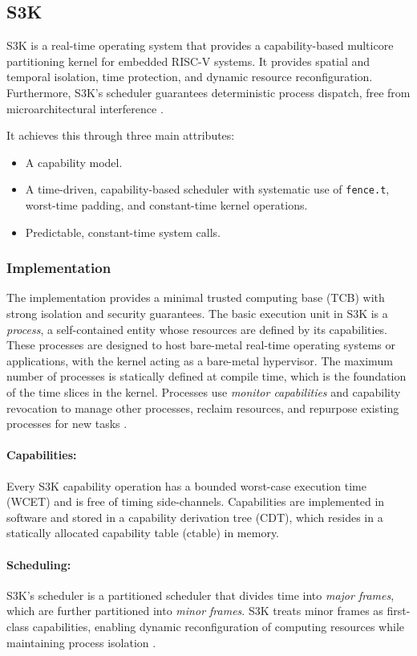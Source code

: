 \subsection{S3K}
S3K is a real-time operating system that provides a capability-based multicore
partitioning kernel for embedded RISC-V systems. It provides spatial and
temporal isolation, time protection, and dynamic resource reconfiguration.
Furthermore, S3K's scheduler guarantees deterministic process dispatch, free
from microarchitectural interference \cite{karlsson2025}.

It achieves this through three main attributes:
\begin{itemize}
  \item A capability model.
  \item A time-driven, capability-based scheduler with systematic use of
    \texttt{fence.t}, worst-time padding, and constant-time kernel operations.
  \item Predictable, constant-time system calls.
\end{itemize}

\subsubsection{Implementation}
The implementation provides a minimal trusted computing base (TCB) with strong
isolation and security guarantees. The basic execution unit in S3K is a
\emph{process}, a self-contained entity whose resources are defined by its
capabilities. These processes are designed to host bare-metal real-time
operating systems or applications, with the kernel acting as a bare-metal
hypervisor. The maximum number of processes is statically defined at compile
time, which is the foundation of the time slices in the kernel. Processes use
\emph{monitor capabilities} and capability revocation to manage other
processes, reclaim resources, and repurpose existing processes for new tasks
\cite{karlsson2025}.

\paragraph{Capabilities:}
Every S3K capability operation has a bounded worst-case execution time (WCET)
and is free of timing side-channels. Capabilities are implemented in software
and stored in a capability derivation tree (CDT), which resides in a statically
allocated capability table (ctable) in memory.

\paragraph{Scheduling:}
S3K's scheduler is a partitioned scheduler that divides time into \emph{major
frames}, which are further partitioned into \emph{minor frames}. S3K treats
minor frames as first-class capabilities, enabling dynamic reconfiguration of
computing resources while maintaining process isolation \cite{karlsson2025}.

